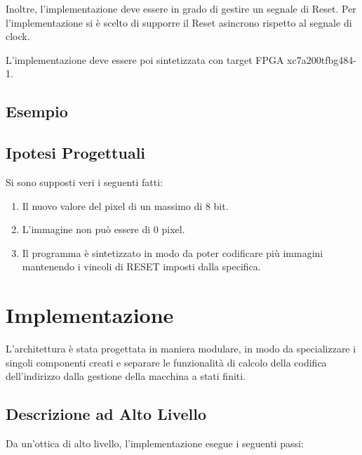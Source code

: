 \documentclass{article}
\begin{document}
Inoltre, l'implementazione deve essere in grado di gestire un segnale di Reset. Per l'implementazione si è scelto di supporre il Reset asincrono rispetto al segnale di clock.

L'implementazione deve essere poi sintetizzata con target FPGA xc7a200tfbg484-1.

\subsection{Esempio}



\subsection{Ipotesi Progettuali}
\label{ipotesi}
Si sono supposti veri i seguenti fatti:
\begin{enumerate}
\item Il nuovo valore del pixel di un massimo di 8 bit.
\item L'immagine non può essere di 0 pixel.
\item Il programma è sintetizzato in modo da poter codificare più immagini mantenendo i vincoli di RESET imposti dalla specifica. 
\end{enumerate}
 

\section{Implementazione}

L'architettura è stata progettata in maniera modulare, in modo da specializzare i singoli componenti creati e separare le funzionalità
di calcolo della codifica dell'indirizzo dalla gestione della macchina a stati finiti.


\subsection{Descrizione ad Alto Livello}
\label{alto_livello}

Da un'ottica di alto livello, l'implementazione esegue i seguenti passi:
\end{document}
